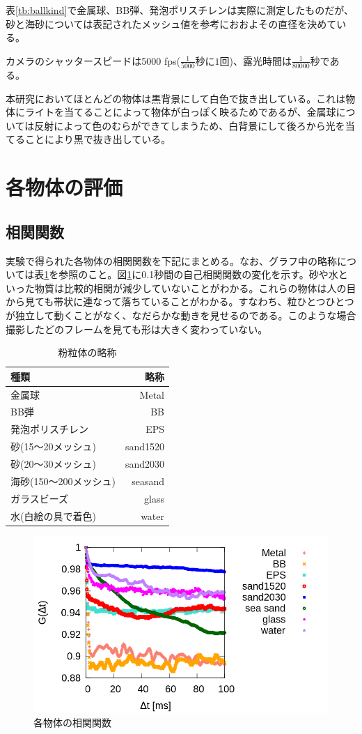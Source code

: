 \documentclass[a4paper,10pt,twocolumn,dvipdfmx]{jsarticle}
\begin{document}
表\ref{tb:ballkind}で金属球、BB弾、発泡ポリスチレンは実際に測定したものだが、砂と海砂については表記されたメッシュ値を参考におおよその直径を決めている。 \par
カメラのシャッタースピードは5000 fps($\frac{1}{5000}秒に1回$)、露光時間は$\frac{1}{80000}秒$である。 \par
本研究においてほとんどの物体は黒背景にして白色で抜き出している。これは物体にライトを当てることによって物体が白っぽく映るためであるが、金属球については反射によって色のむらができてしまうため、白背景にして後ろから光を当てることにより黒で抜き出している。

\section{各物体の評価}
\subsection{相関関数}
実験で得られた各物体の相関関数を下記にまとめる。なお、グラフ中の略称については表\ref{tb:ballname}を参照のこと。図\ref{fig:overall}に0.1秒間の自己相関関数の変化を示す。砂や水といった物質は比較的相関が減少していないことがわかる。これらの物体は人の目から見ても帯状に連なって落ちていることがわかる。すなわち、粒ひとつひとつが独立して動くことがなく、なだらかな動きを見せるのである。このような場合撮影したどのフレームを見ても形は大きく変わっていない。 \par
\begin{table}[H]
	\caption{粉粒体の略称 \label{tb:ballname}}
	\begin{tabular}{lr}
		\toprule
		種類 & 略称 \\
		\midrule
		金属球 & Metal \\
		BB弾 & BB \\
		発泡ポリスチレン & EPS \\
		砂(15〜20メッシュ) & sand1520 \\
		砂(20〜30メッシュ) & sand2030 \\
		海砂(150〜200メッシュ) & seasand \\
		ガラスビーズ & glass \\
		水(白絵の具で着色) & water \\
		\bottomrule
	\end{tabular}
\end{table}
\begin{figure}[H]
	\includegraphics[scale=0.4]{multi.png}
	\caption{各物体の相関関数}
	\label{fig:overall}
\end{figure}
\end{document}
